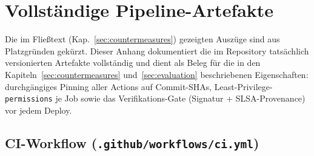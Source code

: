 \documentclass[12pt, a4paper]{scrartcl}
\begin{document}
\appendix
\section{Vollständige Pipeline-Artefakte}\label{app:artifacts}
Die im Fließtext (Kap.~\ref{sec:countermeasures}) gezeigten Auszüge sind
aus Platzgründen gekürzt. Dieser Anhang dokumentiert die im Repository
tatsächlich versionierten Artefakte vollständig und dient als Beleg für
die in den Kapiteln~\ref{sec:countermeasures} und~\ref{sec:evaluation}
beschriebenen Eigenschaften: durchgängiges Pinning aller Actions auf
Commit-SHAs, Least-Privilege-\texttt{permissions} je Job sowie das
Verifikations-Gate (Signatur + SLSA-Provenance) vor jedem Deploy.

\subsection{CI-Workflow (\texttt{.github/workflows/ci.yml})}
\end{document}
